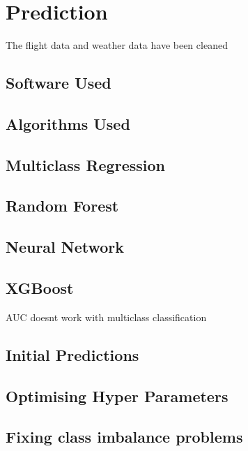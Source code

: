 \chapter{Prediction}
The flight data and weather data have been cleaned

\section{Software Used}

\section{Algorithms Used}
\section{Multiclass Regression}
\section{Random Forest}
\section{Neural Network}
\section{XGBoost}
AUC doesnt work with multiclass classification

\section{Initial Predictions}

\section{Optimising Hyper Parameters}

\section{Fixing class imbalance problems}